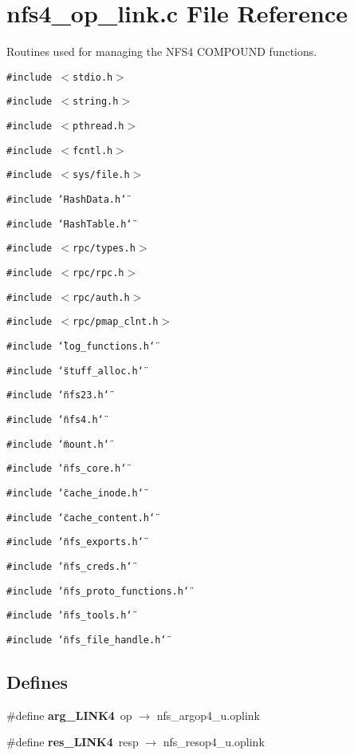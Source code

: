 \section{nfs4\_\-op\_\-link.c File Reference}
\label{nfs4__op__link_8c}
Routines used for managing the NFS4 COMPOUND functions. 

{\tt \#include $<$stdio.h$>$}\par
{\tt \#include $<$string.h$>$}\par
{\tt \#include $<$pthread.h$>$}\par
{\tt \#include $<$fcntl.h$>$}\par
{\tt \#include $<$sys/file.h$>$}\par
{\tt \#include \char`\"{}Hash\-Data.h\char`\"{}}\par
{\tt \#include \char`\"{}Hash\-Table.h\char`\"{}}\par
{\tt \#include $<$rpc/types.h$>$}\par
{\tt \#include $<$rpc/rpc.h$>$}\par
{\tt \#include $<$rpc/auth.h$>$}\par
{\tt \#include $<$rpc/pmap\_\-clnt.h$>$}\par
{\tt \#include \char`\"{}log\_\-functions.h\char`\"{}}\par
{\tt \#include \char`\"{}stuff\_\-alloc.h\char`\"{}}\par
{\tt \#include \char`\"{}nfs23.h\char`\"{}}\par
{\tt \#include \char`\"{}nfs4.h\char`\"{}}\par
{\tt \#include \char`\"{}mount.h\char`\"{}}\par
{\tt \#include \char`\"{}nfs\_\-core.h\char`\"{}}\par
{\tt \#include \char`\"{}cache\_\-inode.h\char`\"{}}\par
{\tt \#include \char`\"{}cache\_\-content.h\char`\"{}}\par
{\tt \#include \char`\"{}nfs\_\-exports.h\char`\"{}}\par
{\tt \#include \char`\"{}nfs\_\-creds.h\char`\"{}}\par
{\tt \#include \char`\"{}nfs\_\-proto\_\-functions.h\char`\"{}}\par
{\tt \#include \char`\"{}nfs\_\-tools.h\char`\"{}}\par
{\tt \#include \char`\"{}nfs\_\-file\_\-handle.h\char`\"{}}\par
\subsection*{Defines}
\begin{CompactItemize}
\item 
\#define {\bf arg\_\-LINK4}\ op $\rightarrow$ nfs\_\-argop4\_\-u.oplink
\item 
\#define {\bf res\_\-LINK4}\ resp $\rightarrow$ nfs\_\-resop4\_\-u.oplink
\end{CompactItemize}
